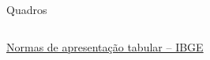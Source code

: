 \documentclass{beamer}
\begin{document}
\begin{frame}{\scriptsize Quadros}
\begin{columns}
\begin{column}{.5\textwidth}
      \hfill \href{https://biblioteca.ibge.gov.br/index.php/biblioteca-catalogo?view=detalhes&id=223907}
      {Normas de apresentação tabular -- IBGE}
    \end{column}
    \begin{column}{.5\textwidth}
    \end{column}
  \end{columns}
\end{frame}
\end{document}
